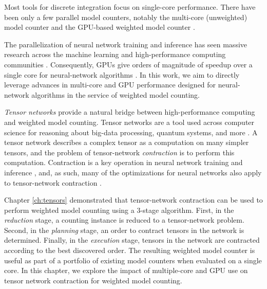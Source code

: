 Most tools for discrete integration focus on single-core performance. There have been only a few parallel model counters, notably the multi-core (unweighted) model counter  \cite{BSB15} and the GPU-based weighted model counter  \cite{FHWZ18,FHZ19}.


The parallelization of neural network training and inference has seen massive research across the machine learning and high-performance computing communities \cite{ABCCDDDGII16,JYPPABBBBB17,PGMLJGKLGA19}. Consequently, GPUs give orders of magnitude of speedup over a single core for neural-network algorithms \cite{KSTKPPRS19,NRBHHJN15}. In this work, we aim to directly leverage advances in multi-core and GPU performance designed for neural-network algorithms in the service of weighted model counting. %

\emph{Tensor networks} provide a natural bridge between high-performance computing and weighted model counting. Tensor networks are a tool used across computer science for reasoning about big-data processing, quantum systems, and more \cite{BB17,Cichocki14,Orus14}. A tensor network describes a complex tensor as a computation on many simpler tensors, and the problem of tensor-network \emph{contraction} is to perform this computation. Contraction is a key operation in neural network training and inference \cite{BK07,Hirata03,KKCLA17,VZTGDMVAC18}, and, as such, many of the optimizations for neural networks also apply to tensor-network contraction \cite{KSTKPPRS19,NRBHHJN15,RMGZFZHVL19}.

Chapter \ref{ch:tensors} demonstrated that tensor-network contraction can be used to perform weighted model counting using a 3-stage algorithm. First, in the \emph{reduction} stage, a counting instance is reduced to a tensor-network problem. Second, in the \emph{planning} stage, an order to contract tensors in the network is determined. Finally, in the \emph{execution} stage, tensors in the network are contracted according to the best discovered order. The resulting weighted model counter is useful as part of a portfolio of existing model counters when evaluated on a single core. In this chapter, we explore the impact of multiple-core and GPU use on tensor network contraction for weighted model counting. 

